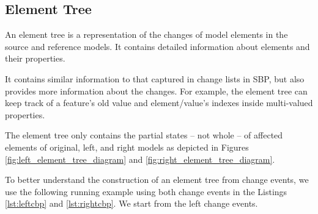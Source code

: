 \documentclass{jot}
\begin{document}
\subsection{Element Tree}
\label{sec:tree_construction}
An element tree is a representation of the changes of model elements in the source and reference models.
It contains detailed information about elements and their properties.

It contains similar information to that captured in change lists in SBP, but also provides more information about the changes.
For example, the element tree can keep track of a feature's old value and element/value's indexes inside multi-valued properties. 

The element tree only contains the partial states -- not whole -- of affected elements of original, left, and right models as depicted in Figures \ref{fig:left_element_tree_diagram} and \ref{fig:right_element_tree_diagram}.

To better understand the construction of an element tree from change events, we use the following running example using both change events in the Listings \ref{lst:leftcbp} and \ref{lst:rightcbp}. We start from the left change events. 
\end{document}
